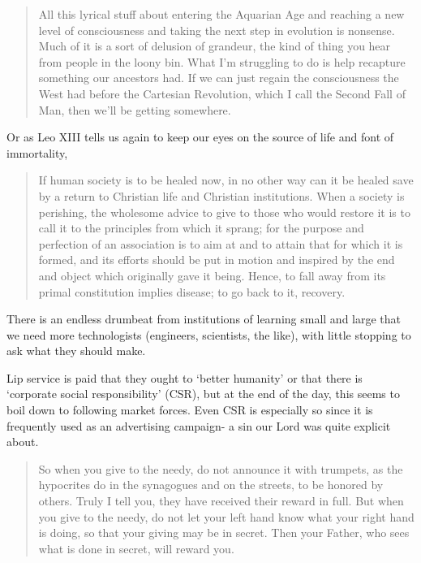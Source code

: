 \documentclass[letterpaper]{article}
\begin{document}
\begin{quote}
  All this lyrical stuff about entering the Aquarian Age and reaching a new level of consciousness and taking the next step in evolution is nonsense. Much of it is a sort of delusion of grandeur, the kind of thing you hear from people in the loony bin. What I'm struggling to do is help recapture something our ancestors had. If we can just regain the consciousness the West had before the Cartesian Revolution, which I call the Second Fall of Man, then we'll be getting somewhere.

\end{quote}

Or as Leo XIII tells us again to keep our eyes on the source of life and font of immortality,

\begin{quote}
  If human society is to be healed now, in no other way can it be healed save by a return to Christian life and Christian institutions. When a society is perishing, the wholesome advice to give to those who would restore it is to call it to the principles from which it sprang; for the purpose and perfection of an association is to aim at and to attain that for which it is formed, and its efforts should be put in motion and inspired by the end and object which originally gave it being. Hence, to fall away from its primal constitution implies disease; to go back to it, recovery.
\end{quote}

There is an endless drumbeat from institutions of learning small and large that we need more technologists (engineers, scientists, the like), with little stopping to ask what they should make.

Lip service is paid that they ought to `better humanity' or that there is `corporate social responsibility' (CSR), but at the end of the day, this seems to boil down to following market forces. Even CSR is especially so since it is frequently used as an advertising campaign- a sin our Lord was quite explicit about.

\begin{quote}
  So when you give to the needy, do not announce it with trumpets, as the hypocrites do in the synagogues and on the streets, to be honored by others. Truly I tell you, they have received their reward in full. But when you give to the needy, do not let your left hand know what your right hand is doing, so that your giving may be in secret. Then your Father, who sees what is done in secret, will reward you.
\end{quote}
\end{document}
